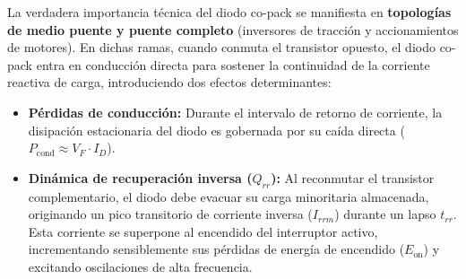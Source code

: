 \documentclass[11pt,a4paper]{article}
\begin{document}
La verdadera importancia técnica del diodo co-pack se manifiesta en \textbf{topologías de medio puente y puente completo} (inversores de tracción y accionamientos de motores). En dichas ramas, cuando conmuta el transistor opuesto, el diodo co-pack entra en conducción directa para sostener la continuidad de la corriente reactiva de carga, introduciendo dos efectos determinantes:
\begin{itemize}[leftmargin=*, noitemsep, topsep=2pt]
  \item \textbf{Pérdidas de conducción:} Durante el intervalo de retorno de corriente, la disipación estacionaria del diodo es gobernada por su caída directa ($P_{\text{cond}} \approx V_F \cdot I_D$).
  \item \textbf{Dinámica de recuperación inversa ($Q_{rr}$):} Al reconmutar el transistor complementario, el diodo debe evacuar su carga minoritaria almacenada, originando un pico transitorio de corriente inversa ($I_{rrm}$) durante un lapso $t_{rr}$. Esta corriente se superpone al encendido del interruptor activo, incrementando sensiblemente sus pérdidas de energía de encendido ($E_{\text{on}}$) y excitando oscilaciones de alta frecuencia.
\end{itemize}
\end{document}
